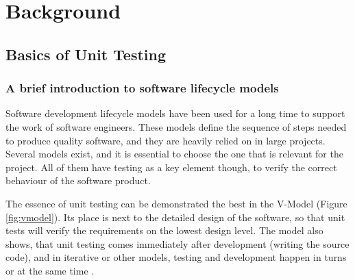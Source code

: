 \chapter{Background}
\section{Basics of Unit Testing}

\subsection{A brief introduction to software lifecycle models}
Software development lifecycle models have been used for a long time to support the work of software engineers. These models define the sequence of steps needed to produce quality software, and they are heavily relied on in large projects. Several models exist, and it is essential to choose the one that is relevant for the project. All of them have testing as a key element though, to verify the correct behaviour of the software product. 

The essence of unit testing can be demonstrated the best in the V-Model (Figure \ref{fig:vmodel}). Its place is next to the detailed design of the software, so that unit tests will verify the requirements on the lowest design level. The model also shows, that unit testing comes immediately after development (writing the source code), and in iterative or other models, testing and development happen in turns or at the same time \cite{Ruparelia:2010:SDL:1764810.1764814} . 



